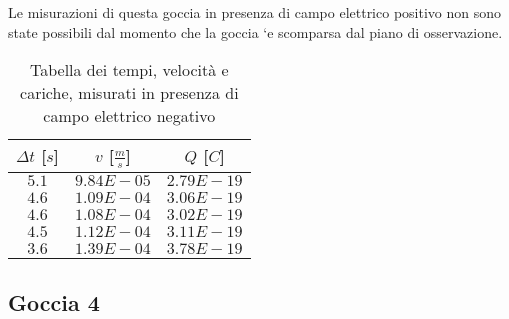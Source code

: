\documentclass{article}
\begin{document}
\begin{multicols}{2}

Le misurazioni di questa goccia in presenza di campo elettrico positivo non sono state possibili dal momento che la goccia `e scomparsa dal piano di osservazione.

\columnbreak

\begin{table}[H]
	\centering
	\begin{tabular}{| c | c | c |}
		\hline
		$\Delta t$ [$s$] & $v$ [$\frac ms$] & $Q$ [$C$] \\
		\hline
		$5.1$ & $9.84E-05$ & $2.79E-19$ \\
		$4.6$ & $1.09E-04$ & $3.06E-19$ \\
		$4.6$ & $1.08E-04$ & $3.02E-19$ \\
		$4.5$ & $1.12E-04$ & $3.11E-19$ \\
		$3.6$ & $1.39E-04$ & $3.78E-19$ \\
		\hline		
	\end{tabular}
	\caption{Tabella dei tempi, velocità e cariche, misurati in presenza di campo elettrico negativo}
	\label{}
\end{table}
	
\end{multicols}

\subsection{Goccia 4}
\end{document}
